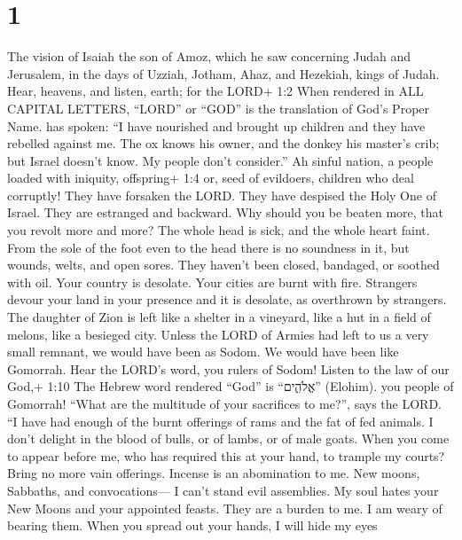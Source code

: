 \hypertarget{section}{%
\section{1}\label{section}}

 The vision of Isaiah the son of Amoz, which he saw
concerning Judah and Jerusalem, in the days of Uzziah, Jotham, Ahaz, and
Hezekiah, kings of Judah.  Hear, heavens, and listen, earth;
for the LORD+ 1:2 When rendered in ALL CAPITAL LETTERS, ``LORD'' or
``GOD'' is the translation of God's Proper Name. has spoken: ``I have
nourished and brought up children and they have rebelled against me.
 The ox knows his owner, and the donkey his master's crib;
but Israel doesn't know. My people don't consider.''  Ah
sinful nation, a people loaded with iniquity, offspring+ 1:4 or, seed of
evildoers, children who deal corruptly! They have forsaken the LORD.
They have despised the Holy One of Israel. They are estranged and
backward.  Why should you be beaten more, that you revolt
more and more? The whole head is sick, and the whole heart faint.
 From the sole of the foot even to the head there is no
soundness in it, but wounds, welts, and open sores. They haven't been
closed, bandaged, or soothed with oil.  Your country is
desolate. Your cities are burnt with fire. Strangers devour your land in
your presence and it is desolate, as overthrown by strangers.
 The daughter of Zion is left like a shelter in a vineyard,
like a hut in a field of melons, like a besieged city. 
Unless the LORD of Armies had left to us a very small remnant, we would
have been as Sodom. We would have been like Gomorrah.  Hear
the LORD's word, you rulers of Sodom! Listen to the law of our God,+
1:10 The Hebrew word rendered ``God'' is ``אֱלֹהִ֑ים'' (Elohim). you
people of Gomorrah!  ``What are the multitude of your
sacrifices to me?'', says the LORD. ``I have had enough of the burnt
offerings of rams and the fat of fed animals. I don't delight in the
blood of bulls, or of lambs, or of male goats.  When you
come to appear before me, who has required this at your hand, to trample
my courts?  Bring no more vain offerings. Incense is an
abomination to me. New moons, Sabbaths, and convocations--- I can't
stand evil assemblies.  My soul hates your New Moons and
your appointed feasts. They are a burden to me. I am weary of bearing
them.  When you spread out your hands, I will hide my eyes
